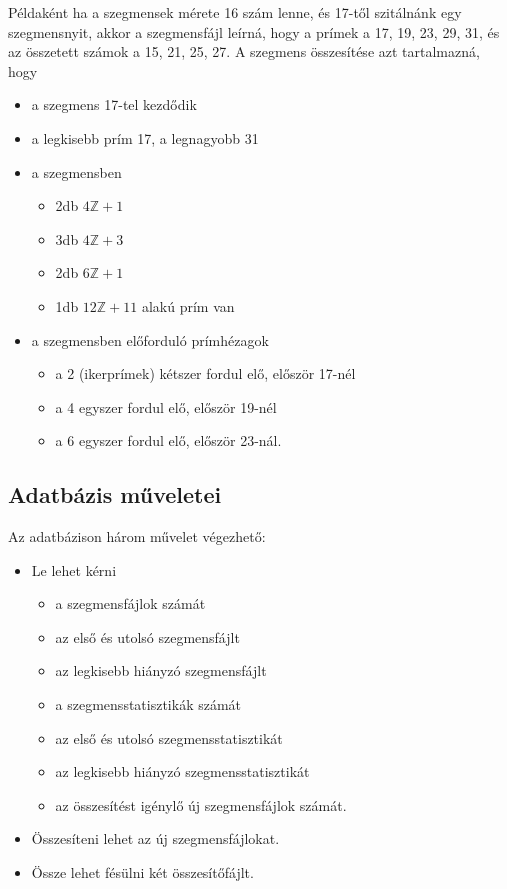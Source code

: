 Példaként ha a szegmensek mérete 16 szám lenne, és 17-től szitálnánk egy szegmensnyit, akkor a szegmensfájl leírná, hogy a prímek a 17, 19, 23, 29, 31, és az összetett számok a 15, 21, 25, 27.
A szegmens összesítése azt tartalmazná, hogy
\begin{itemize}
\item a szegmens 17-tel kezdődik
\item a legkisebb prím 17, a legnagyobb 31
\item a szegmensben
\begin{itemize}
\item 2db $4\mathbb{Z}+1$
\item 3db $4\mathbb{Z}+3$
\item 2db $6\mathbb{Z}+1$
\item 1db $12\mathbb{Z}+11$ alakú prím van
\end{itemize}
\item a szegmensben előforduló prímhézagok
\begin{itemize}
\item a 2 (ikerprímek) kétszer fordul elő, először 17-nél
\item a 4 egyszer fordul elő, először 19-nél
\item a 6 egyszer fordul elő, először 23-nál.
\end{itemize}
\end{itemize}

\subsection{Adatbázis műveletei}

Az adatbázison három művelet végezhető:
\begin{itemize}

\item Le lehet kérni
\begin{itemize}
\item a szegmensfájlok számát
\item az első és utolsó szegmensfájlt
\item az legkisebb hiányzó szegmensfájlt
\item a szegmensstatisztikák számát
\item az első és utolsó szegmensstatisztikát
\item az legkisebb hiányzó szegmensstatisztikát
\item az összesítést igénylő új szegmensfájlok számát.
\end{itemize}

\item Összesíteni lehet az új szegmensfájlokat.

\item Össze lehet fésülni két összesítőfájlt.

\end{itemize}

